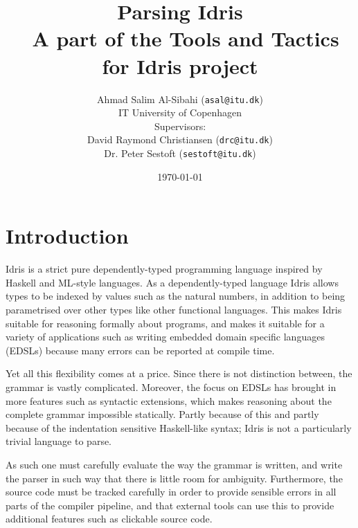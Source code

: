 \documentclass[a4paper]{article}%
\begin{document}
\title{Parsing Idris \\ \normalsize{A part of the Tools and Tactics for Idris project}}
\author{Ahmad Salim Al-Sibahi (\texttt{asal@itu.dk}) \\IT University of Copenhagen\\Supervisors: \\David Raymond Christiansen (\texttt{drc@itu.dk})\\ Dr. Peter Sestoft (\texttt{sestoft@itu.dk})}
\date{\today}


\maketitle
\lstset{basicstyle=\scriptsize\unicodemonofamily, captionpos=b, extendedchars=false, numbers=left, stepnumber=3, firstnumber=1, language=Haskell}



\section{Introduction}
\label{sec:Introduction}

Idris\cite{brady2013idris} is a strict pure dependently-typed programming language inspired by Haskell\cite{marlow2010haskell} and ML-style languages\cite{milner1997definition}.
As a dependently-typed language Idris allows types to be indexed by values such as the natural numbers, in addition to being parametrised over other types
like other functional languages.
This makes Idris suitable for reasoning formally about programs, and makes it suitable for a variety of applications
such as writing  embedded domain specific languages (EDSLs) because many errors can be reported at compile time.

Yet all this flexibility comes at a price.
Since there is not distinction between, the grammar is vastly complicated. Moreover, the focus on EDSLs has brought in more features such as syntactic extensions,
which makes reasoning about the complete grammar impossible statically.
Partly because of this and partly because of the indentation sensitive Haskell-like syntax; Idris is not a particularly trivial language to parse.

As such one must carefully evaluate the way the grammar is written, and write the parser in such way that there is little room for ambiguity.
Furthermore, the source code must be tracked carefully in order to provide sensible errors in all parts of the compiler pipeline, and that external tools can use this to provide additional features such as clickable source code.
\end{document}
